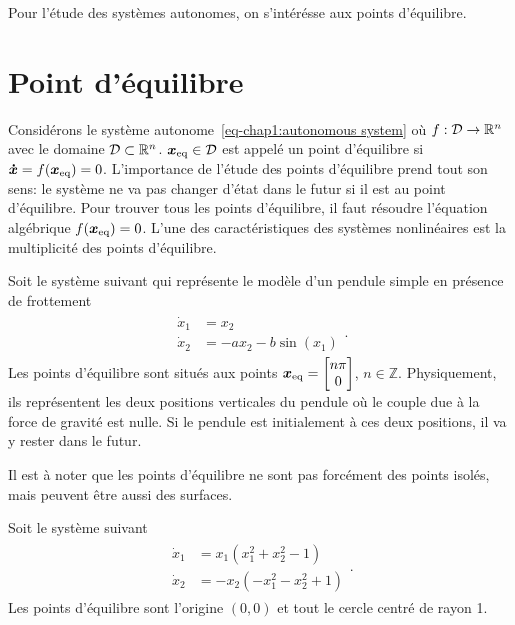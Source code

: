 Pour l'étude des systèmes autonomes, on s'intérésse aux points d'équilibre.


\section{Point d'équilibre}
Considérons le système autonome~\eqref{eq-chap1:autonomous system} où $f:{\cal D}\rightarrow\mathbb{R}^n$ avec le domaine ${\cal D}\subset\mathbb{R}^n$. $\bm{x}_{\rm eq}\in{\cal D}$ est appelé un point d'équilibre si $\bm{\dot{x}}=f(\bm{x}_{\rm eq})=0$. L'importance de l'étude des points d'équilibre prend tout son sens: le système ne va pas changer d'état dans le futur si il est au point d'équilibre. Pour trouver tous les points d'équilibre, il faut résoudre l'équation algébrique $f(\bm{x}_{\rm eq})=0$. L'une des caractéristiques des systèmes nonlinéaires est la multiplicité des points d'équilibre. 
\begin{example}\label{expl:pendule simple} 
	Soit le système suivant qui représente le modèle d'un pendule simple en présence de frottement
	\begin{align*}
		\begin{split}
			\dot{x}_1 &= x_2\\
			\dot{x}_2 &=-ax_2 -b\sin(x_1)
		\end{split}.
	\end{align*}
	Les points d'équilibre sont situés aux points $\bm{x}_{\rm eq}=\begin{bmatrix}
	n\pi\\0
	\end{bmatrix}$, $n\in\mathbb{Z}$. Physiquement, ils représentent les deux positions verticales du pendule où le couple due à la force de gravité est nulle. Si le pendule est initialement à ces deux positions, il va y rester dans le futur.
\end{example}
Il est à noter que les points d'équilibre ne sont pas forcément des points isolés, mais peuvent être aussi des surfaces.
\begin{example}
Soit le système suivant 
\begin{align*}
	\begin{split}
		\dot{x}_1 &=x_1(x_1^2+x_2^2-1) \\ 
		\dot{x}_2 &=-x_2(-x_1^2-x_2^2+1)
	\end{split}.
\end{align*}
Les points d'équilibre sont l'origine $(0,0)$ et tout le cercle centré de rayon 1. 
\end{example}
